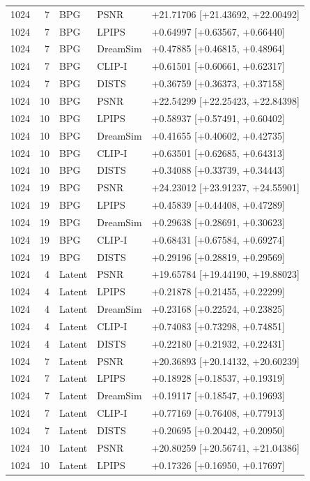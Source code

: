 \documentclass[10pt,letterpaper]{article}
\begin{document}
\begin{longtable}{@{}rrlll@{}}
1024 & 7 & BPG & PSNR & +21.71706 [+21.43692, +22.00492]\\
1024 & 7 & BPG & LPIPS & +0.64997 [+0.63567, +0.66440]\\
1024 & 7 & BPG & DreamSim & +0.47885 [+0.46815, +0.48964]\\
1024 & 7 & BPG & CLIP-I & +0.61501 [+0.60661, +0.62317]\\
1024 & 7 & BPG & DISTS & +0.36759 [+0.36373, +0.37158]\\
1024 & 10 & BPG & PSNR & +22.54299 [+22.25423, +22.84398]\\
1024 & 10 & BPG & LPIPS & +0.58937 [+0.57491, +0.60402]\\
1024 & 10 & BPG & DreamSim & +0.41655 [+0.40602, +0.42735]\\
1024 & 10 & BPG & CLIP-I & +0.63501 [+0.62685, +0.64313]\\
1024 & 10 & BPG & DISTS & +0.34088 [+0.33739, +0.34443]\\
1024 & 19 & BPG & PSNR & +24.23012 [+23.91237, +24.55901]\\
1024 & 19 & BPG & LPIPS & +0.45839 [+0.44408, +0.47289]\\
1024 & 19 & BPG & DreamSim & +0.29638 [+0.28691, +0.30623]\\
1024 & 19 & BPG & CLIP-I & +0.68431 [+0.67584, +0.69274]\\
1024 & 19 & BPG & DISTS & +0.29196 [+0.28819, +0.29569]\\
1024 & 4 & Latent & PSNR & +19.65784 [+19.44190, +19.88023]\\
1024 & 4 & Latent & LPIPS & +0.21878 [+0.21455, +0.22299]\\
1024 & 4 & Latent & DreamSim & +0.23168 [+0.22524, +0.23825]\\
1024 & 4 & Latent & CLIP-I & +0.74083 [+0.73298, +0.74851]\\
1024 & 4 & Latent & DISTS & +0.22180 [+0.21932, +0.22431]\\
1024 & 7 & Latent & PSNR & +20.36893 [+20.14132, +20.60239]\\
1024 & 7 & Latent & LPIPS & +0.18928 [+0.18537, +0.19319]\\
1024 & 7 & Latent & DreamSim & +0.19117 [+0.18547, +0.19693]\\
1024 & 7 & Latent & CLIP-I & +0.77169 [+0.76408, +0.77913]\\
1024 & 7 & Latent & DISTS & +0.20695 [+0.20442, +0.20950]\\
1024 & 10 & Latent & PSNR & +20.80259 [+20.56741, +21.04386]\\
1024 & 10 & Latent & LPIPS & +0.17326 [+0.16950, +0.17697]\\

\end{longtable}
\end{document}
